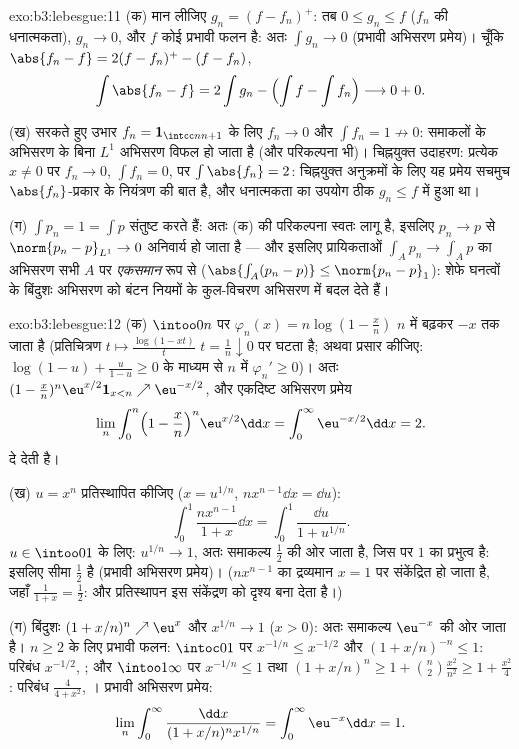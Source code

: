 \begin{solution}{exo:b3:lebesgue:11}
(क) मान लीजिए $g_n = (f - f_n)^+$: तब $0 \leq g_n \leq f$ ($f_n$ की धनात्मकता), 
$g_n \to 0$, और $f$ कोई  प्रभावी फलन है: अतः $\int g_n \to 0$ (प्रभावी
अभिसरण प्रमेय)। चूँकि $\abs{f_n - f} = 2(f - f_n)^+ - (f - f_n)$,
\[
\int\abs{f_n - f} = 2\int g_n - \Bigl(\int f - \int
f_n\Bigr) \longrightarrow 0 + 0 .
\]

(ख) सरकते हुए उभार $f_n = \mathbf 1_{\intcc n{n+1}}$ के लिए  $f_n \to 0$ और $\int f_n = 1 \not\to 0$: समाकलों
के अभिसरण के बिना $L^1$ अभिसरण विफल हो जाता है (और परिकल्पना भी)।
चिह्नयुक्त उदाहरण: प्रत्येक $x \neq 0$ पर $f_n \to 0$, $\int f_n = 0$, पर $\int\abs{f_n} = 2$:
चिह्नयुक्त अनुक्रमों के लिए यह प्रमेय सचमुच $\abs{f_n}$-प्रकार के नियंत्रण
की बात है, और धनात्मकता का उपयोग ठीक $g_n \leq f$ में हुआ था।

(ग)  $\int p_n = 1 = \int p$ संतुष्ट करते हैं: अतः (क) की परिकल्पना स्वतः लागू
है, इसलिए  $p_n \to p$ से $\norm{p_n - p}_{L^1} \to 0$ अनिवार्य हो जाता है --- और
इसलिए प्रायिकताओं $\int_Ap_n \to \int_Ap$ का अभिसरण सभी  $A$ पर \emph{एकसमान}
रूप से ($\abs{\int_A(p_n - p)} \leq
\norm{p_n - p}_1$): शेफे घनत्वों के बिंदुशः अभिसरण को बंटन नियमों के
कुल-विचरण अभिसरण में बदल देते हैं।
\end{solution}

\begin{solution}{exo:b3:lebesgue:12}
(क) $\intoo0n$ पर $\varphi_n(x) = n\log(1 - \frac xn)$ $n$ में बढ़कर $-x$ तक जाता है (प्रतिचित्रण
$t \mapsto
\frac{\log(1 - xt)}{t}$ $t = \frac1n
\downarrow 0$ पर घटता है; अथवा प्रसार कीजिए: $\log(1-u) + \frac{u}{1-u} \geq 0$ के माध्यम से $n$
में $\varphi_{n}' \geq 0$)। अतः $(1 -
\frac xn)^n\eu^{x/2}\mathbf 1_{x<n} \nearrow
\eu^{-x/2}$, और एकदिष्ट अभिसरण प्रमेय
\[
\lim_n\int_0^n\Bigl(1 - \frac xn\Bigr)^n\eu^{x/2}\dd x =
\int_0^\infty\eu^{-x/2}\dd x = 2 .
\]
दे देती है।

(ख) $u = x^n$ प्रतिस्थापित कीजिए ($x = u^{1/n}$, $n x^{n-1}\dd x =
\dd u$):
\[
\int_0^1\frac{nx^{n-1}}{1 + x}\dd x =
\int_0^1\frac{\dd u}{1 + u^{1/n}} .
\]
$u \in \intoo01$ के लिए: $u^{1/n} \to 1$, अतः समाकल्य $\frac12$ की ओर जाता है, जिस पर $1$
का प्रभुत्व है: इसलिए सीमा $\frac12$ है (प्रभावी अभिसरण प्रमेय)। ($nx^{n-1}$
का द्रव्यमान $x
= 1$ पर संकेंद्रित हो जाता है, जहाँ $\frac1{1+x} = \frac12$: और
प्रतिस्थापन इस संकेंद्रण को दृश्य बना देता है।)

(ग) बिंदुशः $(1 + x/n)^n \nearrow \eu^x$ और $x^{1/n} \to
1$ ($x > 0$): अतः समाकल्य $\eu^{-x}$ की ओर जाता
है। $n \geq 2$ के लिए प्रभावी फलन: $\intoc01$ पर $x^{-1/n} \leq x^{-1/2}$ और $(1 + x/n)^{-n} \leq 1$: परिबंध $x^{-1/2}$,
; और $\intoo1\infty$ पर $x^{-1/n} \leq 1$ तथा $(1 + x/n)^n \geq 1 +
\binom n2\frac{x^2}{n^2} \geq 1 + \frac{x^2}4$: परिबंध $\frac{4}{4 + x^2}$, ।
प्रभावी अभिसरण प्रमेय:
\[
\lim_n\int_0^\infty\frac{\dd x}{(1 + x/n)^nx^{1/n}} =
\int_0^\infty\eu^{-x}\dd x = 1 .
\]
\end{solution}

